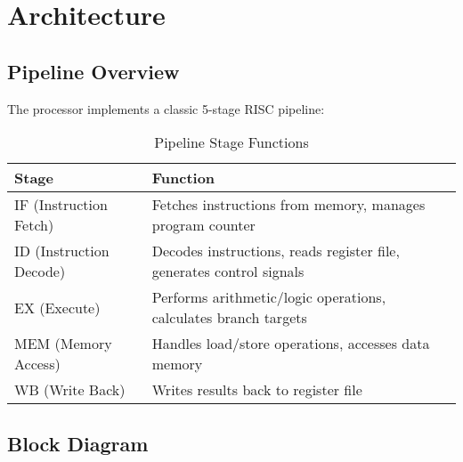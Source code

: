 \documentclass[11pt,a4paper]{article}
\begin{document}
\section{Architecture}

\subsection{Pipeline Overview}
The processor implements a classic 5-stage RISC pipeline:

\begin{table}[h]
\centering
\begin{tabularx}{\textwidth}{|l|X|}
\hline
\textbf{Stage} & \textbf{Function} \\
\hline
IF (Instruction Fetch) & Fetches instructions from memory, manages program counter \\
\hline
ID (Instruction Decode) & Decodes instructions, reads register file, generates control signals \\
\hline
EX (Execute) & Performs arithmetic/logic operations, calculates branch targets \\
\hline
MEM (Memory Access) & Handles load/store operations, accesses data memory \\
\hline
WB (Write Back) & Writes results back to register file \\
\hline
\end{tabularx}
\caption{Pipeline Stage Functions}
\end{table}

\subsection{Block Diagram}
\end{document}
